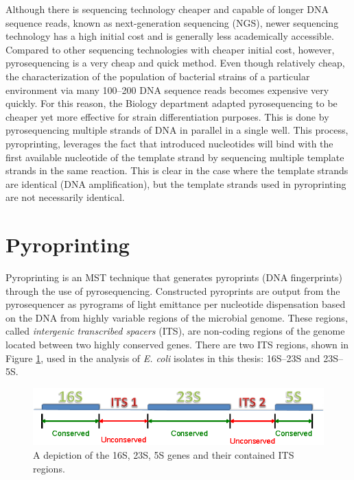 \documentclass[12pt]{ucthesis}
\begin{document}
      Although there is sequencing technology cheaper and capable of longer DNA
      sequence reads, known as next-generation sequencing (NGS), newer
      sequencing technology has a high initial cost and is generally less
      academically accessible. Compared to other sequencing technologies with
      cheaper initial cost, however, pyrosequencing is a very cheap and quick
      method. Even though relatively cheap, the characterization of the
      population of bacterial strains of a particular environment via many
      100--200 DNA sequence reads becomes expensive very quickly. For this
      reason, the Biology department adapted pyrosequencing to be cheaper yet
      more effective for strain differentiation purposes. This is done by
      pyrosequencing multiple strands of DNA in parallel in a single well. This
      process, pyroprinting, leverages the fact that introduced nucleotides
      will bind with the first available nucleotide of the template strand by
      sequencing multiple template strands in the same reaction. This is clear
      in the case where the template strands are identical (DNA amplification),
      but the template strands used in pyroprinting are not necessarily
      identical.

   \section{Pyroprinting}\label{sec:pyroprinting}
      Pyroprinting is an MST technique that generates pyroprints (DNA
      fingerprints) through the use of pyrosequencing. Constructed pyroprints
      are output from the pyrosequencer as pyrograms of light emittance per
      nucleotide dispensation based on the DNA from highly variable regions of
      the microbial genome. These regions, called \textit{intergenic
      transcribed spacers} (ITS), are non-coding regions of the genome located
      between two highly conserved genes. There are two ITS regions, shown in
      Figure \ref{fig:its_regions}, used in the analysis of \textit{E. coli}
      isolates in this thesis: 16S--23S and 23S--5S.
      
      \begin{figure}[t]
         \centering
         \includegraphics[width=\columnwidth]{graphics/ITS_regions.eps}
         \caption{A depiction of the 16S, 23S, 5S genes and their contained ITS
                  regions.}
         \label{fig:its_regions}
      \end{figure}
\end{document}
